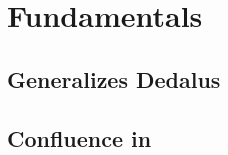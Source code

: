 \section{Fundamentals}

\subsection{\latlang Generalizes Dedalus}

\subsection{Confluence in \latlang}

